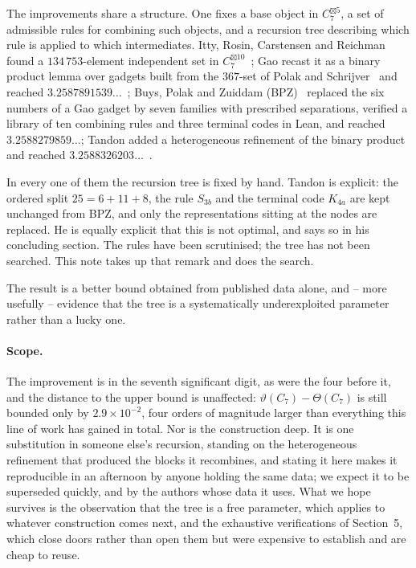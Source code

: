 \documentclass[11pt]{article}
\theoremstyle{definition}
\begin{document}
The improvements share a structure. One fixes a base object in $C_7^{\boxtimes 5}$, a set of
admissible rules for combining such objects, and a recursion tree describing which rule is applied
to which intermediates. Itty, Rosin, Carstensen and Reichman found a $134\,753$-element independent set in
$C_7^{\boxtimes 10}$~\cite{Itty}; Gao recast it as a binary product lemma over
gadgets built from the $367$-set of Polak and Schrijver~\cite{PS} and reached
$3.2587891539\ldots$~\cite{Gao}; Buys, Polak and Zuiddam (BPZ)~\cite{BPZ1,BPZ2} replaced the six numbers of a Gao gadget by
seven families with prescribed separations, verified a library of ten combining rules and three
terminal codes in Lean, and reached $3.2588279859\ldots$; Tandon added a heterogeneous refinement
of the binary product and reached $3.2588326203\ldots$~\cite{Tandon}.

In every one of them the recursion tree is fixed by hand. Tandon is explicit: the ordered split
$25 = 6 + 11 + 8$, the rule $S_{3b}$ and the terminal code $K_{4a}$ are kept unchanged from BPZ,
and only the representations sitting at the nodes are replaced. He is equally explicit that this
is not optimal, and says so in his concluding section. The rules have been scrutinised; the tree
has not been searched. This note takes up that remark and does the search.

The result is a better bound obtained from published data alone, and --
more usefully -- evidence that the tree is a systematically underexploited parameter rather than a
lucky one.


\paragraph{Scope.}
The improvement is in the seventh significant digit, as were the four before it, and the distance
to the upper bound is unaffected: $\vartheta(C_7) - \Theta(C_7)$ is still bounded only by
$2.9 \times 10^{-2}$, four orders of magnitude larger than everything this line of work has gained
in total. Nor is the construction deep. It is one substitution in someone else's recursion,
standing on the heterogeneous refinement that produced the blocks it recombines, and stating it
here makes it reproducible in an afternoon by anyone holding the same data; we expect
it to be superseded quickly, and by the authors whose data it uses. What we hope survives is the
observation that the tree is a free parameter, which applies to whatever construction comes next,
and the exhaustive verifications of Section~5, which close doors rather than open them but were
expensive to establish and are cheap to reuse.
\end{document}
